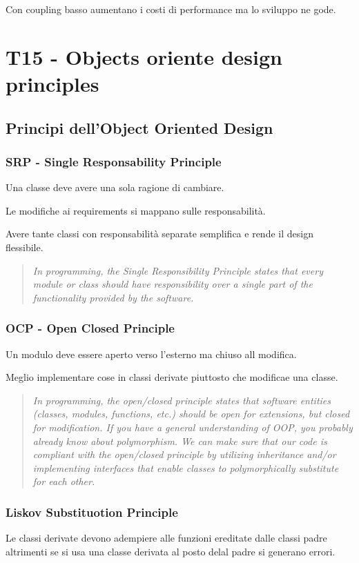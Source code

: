 \documentclass{article}
\begin{document}
Con coupling basso aumentano i costi di performance ma lo sviluppo ne gode.


\section{T15 - Objects oriente design principles}
\subsection{Principi dell'Object Oriented Design}
\subsubsection{SRP - Single Responsability Principle}
Una classe deve avere una sola ragione di cambiare.

Le modifiche ai requirements si mappano sulle responsabilità.

Avere tante classi con responsabilità separate semplifica e rende il design flessibile.

\begin{quotation}
    \textit{
        In programming, the Single Responsibility Principle states that every module or class should have
responsibility over a single part of the functionality provided by the software.
    }
\end{quotation}


\subsubsection{OCP - Open Closed Principle}
Un modulo deve essere aperto verso l'esterno ma chiuso all modifica.

Meglio implementare cose in classi derivate piuttosto che modificae una classe.

\begin{quotation}
    \textit{
        In programming, the open/closed principle states that software entities (classes, modules, functions, etc.)
should be open for extensions, but closed for modification. If you have a general understanding of OOP,
you probably already know about polymorphism. We can make sure that our code is compliant with the
open/closed principle by utilizing inheritance and/or implementing interfaces that enable classes to
polymorphically substitute for each other.
    }
\end{quotation}


\subsubsection{Liskov Substituotion Principle}
Le classi derivate devono adempiere alle funzioni ereditate dalle classi padre
altrimenti se si usa una classe derivata al posto delal padre si generano errori.
\end{document}
